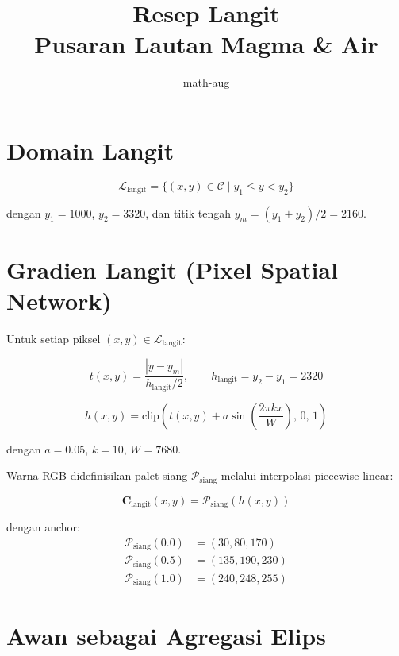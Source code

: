 \documentclass[11pt]{article}
\title{Resep Langit \\ \large Pusaran Lautan Magma \& Air}
\author{math-aug}
\date{}
\begin{document}
\maketitle

\section{Domain Langit}

\begin{equation}
\mathcal{L}_{\text{langit}} = \{(x, y) \in \mathcal{C} \mid y_1 \le y < y_2\}
\end{equation}

dengan $y_1 = 1000$, $y_2 = 3320$, dan titik tengah $y_m = (y_1 + y_2)/2 = 2160$.

\section{Gradien Langit (Pixel Spatial Network)}

Untuk setiap piksel $(x, y) \in \mathcal{L}_{\text{langit}}$:

\begin{equation}
t(x, y) = \frac{|y - y_m|}{h_{\text{langit}} / 2}, \qquad h_{\text{langit}} = y_2 - y_1 = 2320
\end{equation}

\begin{equation}
h(x, y) = \mathrm{clip}\!\left( t(x, y) + a \sin\!\left( \frac{2\pi k x}{W} \right),\, 0,\, 1 \right)
\end{equation}

dengan $a = 0.05$, $k = 10$, $W = 7680$.

Warna RGB didefinisikan palet siang $\mathcal{P}_{\text{siang}}$
melalui interpolasi piecewise-linear:

\begin{equation}
\mathbf{C}_{\text{langit}}(x, y) = \mathcal{P}_{\text{siang}}(h(x, y))
\end{equation}

dengan anchor:
\begin{align}
\mathcal{P}_{\text{siang}}(0.0) &= (30, 80, 170) \\
\mathcal{P}_{\text{siang}}(0.5) &= (135, 190, 230) \\
\mathcal{P}_{\text{siang}}(1.0) &= (240, 248, 255)
\end{align}

\section{Awan sebagai Agregasi Elips}
\end{document}
